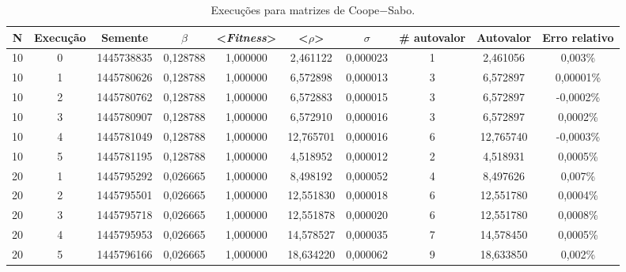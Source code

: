 \newpage
\begin{landscape}
\begin{center}
\begin{table}[htbp]
\caption{Execuções para matrizes de Coope$-$Sabo.}
\label{tab:execucoes10a40}
\begin{tabular}{cccccccccc}
\hline \hline
   \textbf{N} & \textbf{Execução} & \textbf{Semente} & \textbf{$\beta$} & \textbf{<\textit{Fitness}>} & \textbf{<$\rho$>} & \textbf{$\sigma$} & \textbf{\# autovalor} & \textbf{Autovalor} & \textbf{Erro relativo} \\
\hline \hline
        10 &          0 & 1445738835 &   0,128788 &   1,000000 &   2,461122 &   0,000023 &          1 &   2,461056 &    0,003\% \\
\hline
        10 &          1 & 1445780626 &   0,128788 &   1,000000 &   6,572898 &   0,000013 &          3 &   6,572897 &  0,00001\% \\
\hline
        10 &          2 & 1445780762 &   0,128788 &   1,000000 &   6,572883 &   0,000015 &          3 &   6,572897 &  -0,0002\% \\
\hline
        10 &          3 & 1445780907 &   0,128788 &   1,000000 &   6,572910 &   0,000016 &          3 &   6,572897 &   0,0002\% \\
\hline
        10 &          4 & 1445781049 &   0,128788 &   1,000000 &  12,765701 &   0,000016 &          6 &  12,765740 &  -0,0003\% \\
\hline
        10 &          5 & 1445781195 &   0,128788 &   1,000000 &   4,518952 &   0,000012 &          2 &   4,518931 &   0,0005\% \\
\hline
        20 &          1 & 1445795292 &   0,026665 &   1,000000 &   8,498192 &   0,000052 &          4 &   8,497626 &    0,007\% \\
\hline
        20 &          2 & 1445795501 &   0,026665 &   1,000000 &  12,551830 &   0,000018 &          6 &  12,551780 &   0,0004\% \\
\hline
        20 &          3 & 1445795718 &   0,026665 &   1,000000 &  12,551878 &   0,000020 &          6 &  12,551780 &   0,0008\% \\
\hline
        20 &          4 & 1445795953 &   0,026665 &   1,000000 &  14,578527 &   0,000035 &          7 &  14,578450 &   0,0005\% \\
\hline
        20 &          5 & 1445796166 &   0,026665 &   1,000000 &  18,634220 &   0,000062 &          9 &  18,633850 &    0,002\% \\

\end{tabular}
\end{table}
\end{center}
\end{landscape}
